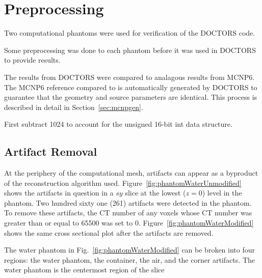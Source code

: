 

\section{Preprocessing}
Two computational phantoms were used for verification of the DOCTORS code.

Some preprocessing was done to each phantom before it was used in DOCTORS to provide results.

The results from DOCTORS were compared to analagous results from MCNP6. The MCNP6 reference compared to is automatically generated by DOCTORS to guarantee that the geometry and source parameters are identical. This process is described in detail in Section~\ref{sec:mcnpgen}.

First subtract 1024 to account for the unsigned 16-bit int data structure.

\subsection{Artifact Removal}
At the periphery of the computational mesh, artifacts can appear as a byproduct of the reconstruction algorithm used. Figure~\ref{fig:phantomWaterUnmodified} shows the artifacts in question in a $sy$ slice at the lowest ($z = 0$) level in the phantom. Two hundred sixty one (261) artifacts were detected in the phantom. To remove these artifacts, the CT number of any voxels whose CT number was greater than or equal to 65500 was set to 0. Figure~\ref{fig:phantomWaterModified} shows the same cross sectional plot after the artifacts are removed.

The water phantom in Fig.~\ref{fig:phantomWaterModified} can be broken into four regions: the water phantom, the container, the air, and the corner artifacts. The water phantom is the centermost region of the slice

